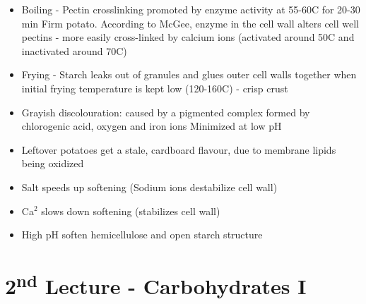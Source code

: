 \begin{highlight}
    \begin{itemize}
        \item Boiling - Pectin crosslinking promoted by enzyme activity at 55-60\textdegree C for 20-30 min
        \subitem Firm potato. According to McGee, enzyme in the cell wall alters cell well pectins - more easily cross-linked by calcium ions (activated around 50\textdegree C and inactivated around 70\textdegree C)
        \item Frying - Starch leaks out of granules and glues outer cell walls together when initial frying temperature is kept low (120-160\textdegree C) - crisp crust
        \item Grayish discolouration: caused by a pigmented complex formed by chlorogenic acid, oxygen and iron ions
        \subitem Minimized at low pH
        \item Leftover potatoes get a stale, cardboard flavour, due to membrane lipids being oxidized
        \item Salt speeds up softening (Sodium ions destabilize cell wall)
        \item Ca$^2$ slows down softening (stabilizes cell wall)
        \item High pH soften hemicellulose and open starch structure
    \end{itemize}
\end{highlight}

\section{2\texorpdfstring{\textsuperscript{nd}}{nd} Lecture - Carbohydrates I}
